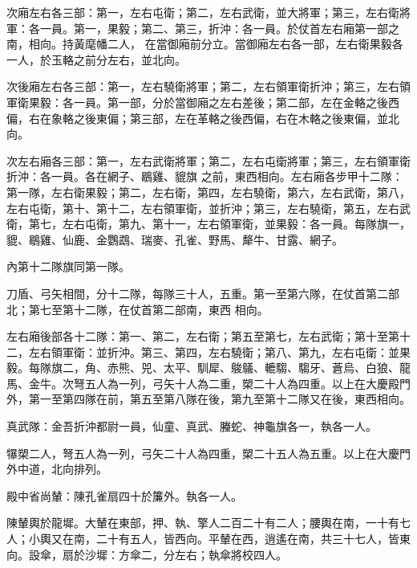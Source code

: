 \begin{pinyinscope}
 次廂左右各三部：第一，左右屯衛；第二，左右武衛，並大將軍；第三，左右衛將軍：各一員。第一，果毅；第二、第三，折沖：各一員。於仗首左右廂第一部之南，相向。持黃麾幡二人，
 在當御廂前分立。當御廂左右各一部，左右衛果毅各一人，於玉輅之前分左右，並北向。



 次後廂左右各三部：第一，左右驍衛將軍；第二，左右領軍衛折沖；第三，左右領軍衛果毅：各一員。第一部，分於當御廂之左右差後；第二部，左在金輅之後西偏，右在象輅之後東偏；第三部，左在革輅之後西偏，右在木輅之後東偏，並北向。



 次左右廂各三部：第一，左右武衛將軍；第二，左右屯衛將軍；第三，左右領軍衛折沖：各一員。各在網子、鶡雞、貔旗
 之前，東西相向。左右廂各步甲十二隊：第一隊，左右衛果毅；第二，左右衛，第四，左右驍衛，第六，左右武衛，第八，左右屯衛，第十、第十二，左右領軍衛，並折沖；第三，左右驍衛，第五，左右武衛，第七，左右屯衛，第九、第十一，左右領軍衛，並果毅：各一員。每隊旗一，貔、鶡雞、仙鹿、金鸚鵡、瑞麥、孔雀、野馬、犛牛、甘露、網子。



 內第十二隊旗同第一隊。



 刀盾、弓矢相間，分十二隊，每隊三十人，五重。第一至第六隊，在仗首第二部北；第七至第十二隊，在仗首第二部南，東西
 相向。



 左右廂後部各十二隊：第一、第二，左右衛；第五至第七，左右武衛；第十至第十二，左右領軍衛：並折沖。第三、第四，左右驍衛；第八、第九，左右屯衛：並果毅。每隊旗二，角、赤熊、兕、太平、馴犀、鵔鸃、轆騶、騶牙、蒼烏、白狼、龍馬、金牛。次弩五人為一列，弓矢十人為二重，槊二十人為四重。以上在大慶殿門外，第一至第四隊在前，第五至第八隊在後，第九至第十二隊又在後，東西相向。



 真武隊：金吾折沖都尉一員，仙童、真武、螣蛇、神龜旗各一，執各一人。



 犦槊二人，弩五人為一列，弓矢二十人為四重，槊二十五人為五重。以上在大慶門外中道，北向排列。



 殿中省尚輦：陳孔雀扇四十於簾外。執各一人。



 陳輦輿於龍墀。大輦在東部，押、執、擎人二百二十有二人；腰輿在南，一十有七人；小輿又在南，二十有五人，皆西向。平輦在西，逍遙在南，共三十七人，皆東向。設傘，扇於沙墀：方傘二，分左右；執傘將校四人。




\end{pinyinscope}

